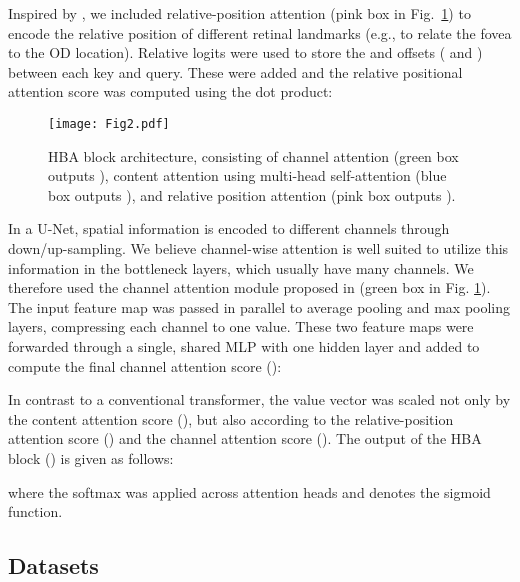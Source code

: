 \documentclass[hidelinks,runningheads]{llncs}
\begin{document}
Inspired by \cite{ramachandran_stand-alone_2019,srinivas_bottleneck_2021}, we included relative-position attention (pink box in Fig.~\ref{fig:MHSA-block}) to encode the relative position of different retinal landmarks (e.g., to relate the fovea to the \ac{OD} location).
Relative logits were used to store the  and  offsets ( and ) between each key and query. These were added and the relative positional attention score  was computed using the dot product:
  




\begin{figure}[!t]
    \centering
    \texttt{[image: Fig2.pdf]}
    \caption{HBA block architecture, consisting of channel attention (green box outputs ), content attention using multi-head self-attention (blue box outputs ), and relative position attention (pink box outputs ).}
    \label{fig:MHSA-block}
\end{figure}

In a U-Net, spatial information is encoded to different channels through down/up-sampling. We believe channel-wise attention is well suited to utilize this information in the bottleneck layers, which usually have many channels. 
We therefore used the channel attention module proposed in \cite{DBLP:journals/corr/abs-1807-06521} (green box in Fig. \ref{fig:MHSA-block}).
The input feature map 
was passed in parallel to average pooling and max pooling layers, compressing each channel to one value.
These two feature maps were forwarded through a single, shared \ac{MLP} with one hidden layer and added to compute the final channel attention score ():

In contrast to a conventional transformer, the value vector was scaled not only by the content attention score (), but also according to the relative-position attention score () and the channel attention score (). 
The output of the \Ac{HBA} block () is given as follows:

where the softmax was applied across attention heads and  denotes the sigmoid function.




















\subsection{Datasets}
\end{document}
